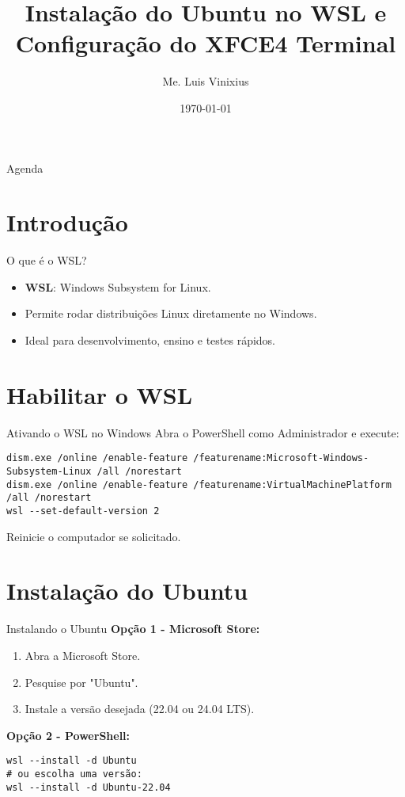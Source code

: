 \documentclass{beamer}
\title[Ubuntu no WSL]{Instalação do Ubuntu no WSL e Configuração do XFCE4 Terminal}
\author{Me. Luis Vinixius}
\date{\today}
\begin{document}
\begin{frame}
    \titlepage
\end{frame}

\begin{frame}{Agenda}
    \tableofcontents
\end{frame}

\section{Introdução}
\begin{frame}{O que é o WSL?}
\begin{itemize}
    \item \textbf{WSL}: Windows Subsystem for Linux.
    \item Permite rodar distribuições Linux diretamente no Windows.
    \item Ideal para desenvolvimento, ensino e testes rápidos.
\end{itemize}
\end{frame}

\section{Habilitar o WSL}
\begin{frame}{Ativando o WSL no Windows}
Abra o PowerShell como Administrador e execute:

\begin{verbatim}
dism.exe /online /enable-feature /featurename:Microsoft-Windows-Subsystem-Linux /all /norestart
dism.exe /online /enable-feature /featurename:VirtualMachinePlatform /all /norestart
wsl --set-default-version 2
\end{verbatim}

Reinicie o computador se solicitado.
\end{frame}

\section{Instalação do Ubuntu}
\begin{frame}{Instalando o Ubuntu}
\textbf{Opção 1 - Microsoft Store:}
\begin{enumerate}
    \item Abra a Microsoft Store.
    \item Pesquise por "Ubuntu".
    \item Instale a versão desejada (22.04 ou 24.04 LTS).
\end{enumerate}

\textbf{Opção 2 - PowerShell:}
\begin{verbatim}
wsl --install -d Ubuntu
# ou escolha uma versão:
wsl --install -d Ubuntu-22.04
\end{verbatim}
\end{frame}
\end{document}

